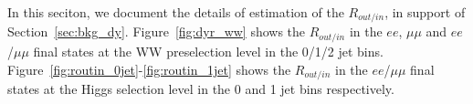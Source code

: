 In this seciton, we document the details of estimation of the $R_{out/in}$, 
in support of Section~\ref{sec:bkg_dy}. 
Figure~\ref{fig:dyr_ww} shows the $R_{out/in}$ in the $ee$, $\mu\mu$ 
and $ee$/$\mu\mu$ final states at the WW preselection level in 
the 0/1/2 jet bins. 
Figure~\ref{fig:routin_0jet}-\ref{fig:routin_1jet} shows the $R_{out/in}$ in the 
$ee$/$\mu\mu$ final states at the Higgs selection level in the 
0 and 1 jet bins respectively. 

\begin{figure}[!hbtp]

\centering
{}
\centering
{}

\end{figure}
